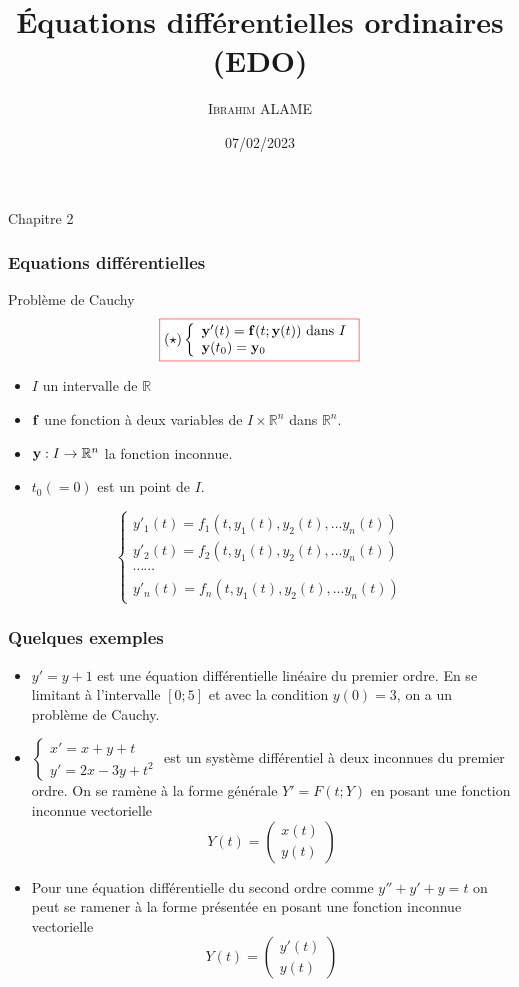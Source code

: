\documentclass{beamer}
\title{Équations différentielles  ordinaires (EDO)}
\author{ \textsc{Ibrahim ALAME}}\institute{ESTP}
\date{07/02/2023}
\newcommand{\myredbox}[1]{\fcolorbox{red}{white}{$\displaystyle#1$}}
\begin{document}
 \begin{frame}
 \begin{center}
 Chapitre 2
 \end{center}
  \titlepage
  \end{frame}

 \begin{frame}
  \frametitle{Equations différentielles}
  \begin{block}{Problème de Cauchy}
  \[\myredbox{(\star)\left\{\begin{array}{l}
{\bf y}'(t) = {\bf f}(t; {\bf y}(t)) \mbox{ dans }I\\
{\bf y}(t_0) = {\bf y}_0
\end{array}\right.
}\]
\begin{itemize}
\item  $I$ un intervalle de $\mathbb{R}$
\item ${\bf f}$ une fonction à deux variables de $I\times \mathbb{R}^n$ dans $\mathbb{R}^n$. 
\item ${\bf y}:I\to \mathbb{R}^n$ la fonction inconnue.
\item $t_0(=0)$ est un point de $I$. 
\end{itemize}
  \end{block}
  \[\left\{\begin{array}{l}
  y'_1(t)=f_1(t,y_1(t),y_2(t),...y_n(t))\\
  y'_2(t)=f_2(t,y_1(t),y_2(t),...y_n(t))\\
  \cdots\cdots \\
  y'_n(t)=f_n(t,y_1(t),y_2(t),...y_n(t))
  \end{array}\right.\]


  \end{frame}
  
   \begin{frame}
  \frametitle{Quelques exemples}
  
\begin{itemize}
\item  $y' = y + 1$ est une équation différentielle linéaire du premier
ordre. En se limitant à l'intervalle $[0; 5]$ et avec la condition
$y(0) = 3$, on a un problème de Cauchy.
\item $\left\{\begin{array}{l}
x' = x + y + t\\
y' = 2x - 3y + t^2
\end{array} \right.$
 est un système différentiel à deux inconnues du premier ordre. On se ramène à la forme générale $Y' = F(t; Y)$ en posant une fonction inconnue vectorielle
\[Y (t) =\left(\begin{array}{l}
x(t)\\
y(t)
\end{array} \right)\]
\item Pour une équation différentielle du second ordre comme $y'' + y' + y = t $ on peut se ramener à la forme présentée en posant une fonction inconnue vectorielle 
\[Y (t) =\left(\begin{array}{l}
y'(t)\\
y(t)
\end{array} \right)\]
\end{itemize}
 
  \end{frame}
  
\end{document}
